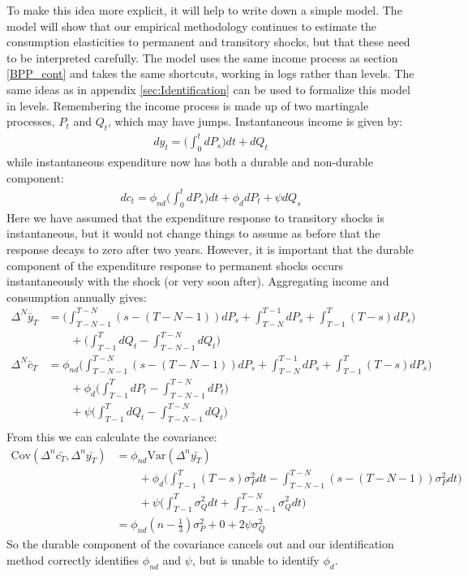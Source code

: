 \documentclass[titlepage]{\econtex}\newcommand{\texname}{IncomeUncertainty}
\begin{document}
To make this idea more explicit, it will help to write down a simple model. The model will show that our empirical methodology continues to estimate the consumption elasticities to permanent and transitory shocks, but that these need to be interpreted carefully. The model uses the same income process as section \ref{BPP_cont} and takes the same shortcuts, working in logs rather than levels. The same ideas as in appendix \ref{sec:Identification} can be used to formalize this model in levels. Remembering the income process is made up of two martingale processes, $P_t$ and $Q_t$, which may have jumps. Instantaneous income is given by:
\begin{align*}
dy_t = \Big( \int_{0}^{t}dP_s \Big) dt  +dQ_t 
\end{align*}
while instantaneous expenditure now has both a durable and non-durable component:
\begin{align*}
dc_t = \phi_{nd} \Big( \int_{0}^{t} dP_s  \Big) dt + \phi_{d} dP_t + \psi dQ_s
\end{align*}
Here we have assumed that the expenditure response to transitory shocks is instantaneous, but it would not change things to assume as before that the response decays to zero after two years. However, it is important that the durable component of the expenditure response to permanent shocks occurs instantaneously with the shock (or very soon after). Aggregating income and consumption annually gives:
\begin{align*}
\Delta^N \bar{y}_T &=  \Big(\int_{T-N-1}^{T-N} (s-(T-N-1))dP_s  + \int_{T-N}^{T-1}dP_s + \int_{T-1}^{T} (T-s)dP_s \Big) \\
& \qquad + \Big(\int_{T-1}^{T} dQ_t -\int_{T-N-1}^{T-N} dQ_t \Big) \\
\Delta^N \bar{c}_T &= \phi_{nd} \Big(\int_{T-N-1}^{T-N} (s-(T-N-1))dP_s  + \int_{T-N}^{T-1}dP_s + \int_{T-1}^{T} (T-s)dP_s \Big) \\
& \qquad + \phi_d \Big(\int_{T-1}^{T} dP_t -\int_{T-N-1}^{T-N} dP_t \Big) \\
& \qquad + \psi \Big(\int_{T-1}^{T} dQ_t -\int_{T-N-1}^{T-N} dQ_t \Big) \\
\end{align*}
From this we can calculate the covariance:
\begin{align*}
\mathrm{Cov}(\Delta^n \bar{c_T},\Delta^n \bar{y_T} ) &= \phi_{nd} \mathrm{Var}(\Delta^n \bar{y_T}) \\
& \qquad + \phi_d \Bigg( \int_{T-1}^{T} (T-s) \sigma_P^2 dt - \int_{T-N-1}^{T-N}(s-(T-N-1)) \sigma_P^2 dt \Bigg) \\
& \qquad + \psi\Bigg(\int_{T-1}^{T}  \sigma_Q^2 dt + \int_{T-N-1}^{T-N}\sigma_Q^2 dt\Bigg) \\
&= \phi_{nd} (n-\frac{1}{3})\sigma_P^2 + 0 +  2 \psi \sigma_Q^2
\end{align*}
So the durable component of the covariance cancels out and our identification method correctly identifies $\phi_{nd}$ and $\psi$, but is unable to identify $\phi_d$.
\end{document}
